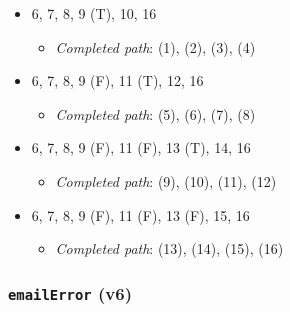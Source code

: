 \documentclass{article}
\newcommand{\completedpath}{\textit{Completed path}}
\begin{document}
\begin{itemize}
    \item 6, 7, 8, 9 (T), 10, 16
          \begin{itemize}
              \item \completedpath: (1), (2), (3), (4)
          \end{itemize}
    \item 6, 7, 8, 9 (F), 11 (T), 12, 16
          \begin{itemize}
              \item \completedpath: (5), (6), (7), (8)
          \end{itemize}
    \item 6, 7, 8, 9 (F), 11 (F), 13 (T), 14, 16
          \begin{itemize}
              \item \completedpath: (9), (10), (11), (12)
          \end{itemize}
    \item 6, 7, 8, 9 (F), 11 (F), 13 (F), 15, 16
          \begin{itemize}
              \item \completedpath: (13), (14), (15), (16)
          \end{itemize}
\end{itemize}

\subsubsection*{\texttt{emailError} (v6)}
\end{document}
